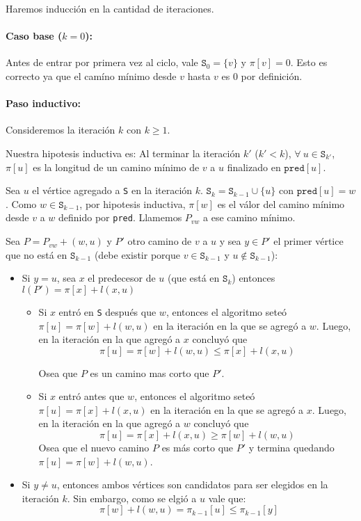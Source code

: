 \begin{demo}
  Haremos inducción en la cantidad de iteraciones.
  \paragraph{Caso base (\(k = 0\)):} Antes de entrar por primera vez al ciclo, vale \(\mathtt{S}_0 =\{v\}\) y \(\mathtt{\pi}[v] = 0\). Esto es correcto ya que el camíno mínimo desde \(v\) hasta \(v\) es 0 por definición.

  \paragraph{Paso inductivo:} Consideremos la iteración \(k\) con \(k \geq 1\).

  Nuestra hipotesis inductiva es: Al terminar la iteración  \(k'\) (\(k' < k\)), \(\forall~u\in \texttt{S}_{k'}\), \(\pi[u]\) es la longitud de un camino mínimo de \(v\) a \(u\) finalizado en \(\texttt{pred}[u]\).

  Sea \(u\) el vértice agregado a \texttt{S} en la iteración \(k\). \(\texttt{S}_{k} = \texttt{S}_{k-1}\cup \{u\}\) con \(\texttt{pred}[u] = w\). Como \(w\in\texttt{S}_{k-1}\), por hipotesis inductiva, \(\pi[w]\) es el válor del camino mínimo desde \(v\) a \(w\) definido por \texttt{pred}. Llamemos \(P_{vw}\) a ese camino mínimo.

  Sea \(P = P_{vw} + (w,u)\) y \(P'\) otro camino de \(v\) a \(u\) y sea \(y\in P'\) el primer vértice que no está en \(\texttt{S}_{k-1}\) (debe existir porque \(v\in \texttt{S}_{k-1}\) y \(u\notin\texttt{S}_{k-1}\)):
  \begin{itemize}
    \item Si \(y = u\), sea \(x\) el predecesor de \(u\) (que está en \(\texttt{S}_k\)) entonces \(l(P') = \pi[x] + l(x,u)\)
          \begin{itemize}
            \item Si \(x\) entró en \texttt{S} después que \(w\), entonces el algoritmo seteó \(\pi[u] = \pi[w] + l(w,u)\) en la iteración en la que se agregó a \(w\). Luego, en la iteración  en la que agregó a \(x\) concluyó que \[\pi[u] = \pi[w] + l(w,u) \leq \pi[x] + l(x,u)\]

                  Osea que \(P\) es un camino mas corto que \(P'\).
            \item  Si \(x\) entró antes que \(w\), entonces el algoritmo seteó \(\pi[u] = \pi[x] + l(x,u)\) en la iteración en la que se agregó a \(x\). Luego, en la iteración en la que agregó a \(w\) concluyó que \[\pi[u] = \pi[x] + l(x,u) \geq \pi[w] + l(w,u)\]
                  Osea que el nuevo camino \(P\) es más corto que \(P'\) y termina quedando \(\pi[u] = \pi[w] + l(w,u)\).
          \end{itemize}
    \item Si \(y\neq u\), entonces ambos vértices son candidatos para ser elegidos en la iteración \(k\). Sin embargo, como se elgió a \(u\) vale que: \[\pi[w] + l(w,u) = \pi_{k-1}[u] \leq\pi_{k-1}[y]\]


\end{itemize}
\end{demo}
